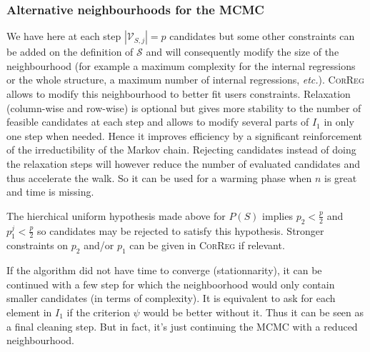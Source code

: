 \documentclass[11pt,a4paper]{article}
\begin{document}
\subsubsection{Alternative neighbourhoods for the MCMC}
	We have here at each step $|\mathcal{V}_{S,j}|=p$ candidates but some other constraints can be added on the definition of $\mathcal{S}$ and will consequently modify the size of the neighbourhood (for example a maximum complexity for the internal regressions or the whole structure, a maximum number of internal regressions, {\it etc.}). \textsc{CorReg} allows to modify this neighbourhood to better fit users constraints. Relaxation (column-wise and row-wise) is optional but gives more stability to the number of feasible candidates at each step and allows to modify several parts of $I_1$ in only one step when needed. Hence it improves efficiency by a significant reinforcement of the irreductibility of the Markov chain. Rejecting candidates instead of doing the relaxation steps will  however reduce the number of evaluated candidates and thus accelerate the walk. So it can be used for a warming phase when $n$ is great and time is missing.
	
	The hierchical uniform hypothesis made above for $P(S)$ implies $p_2<\frac{p}{2}$ and $p_1^j<\frac{p}{2}$ so candidates may be rejected to satisfy this hypothesis. Stronger constraints on $p_2$ and/or $p_1$ can be given in \textsc{CorReg} if relevant.
	
If the algorithm did not have time to converge (stationnarity), it can be continued with a few step for which the neighboorhood would only contain smaller candidates (in terms of complexity). It is equivalent to ask for each element in $I_1$ if the criterion $\psi$ would be better without it. Thus it can be seen as a final cleaning step. But in fact, it's just continuing the MCMC with a reduced neighbourhood.	
	
	
	
\end{document}
